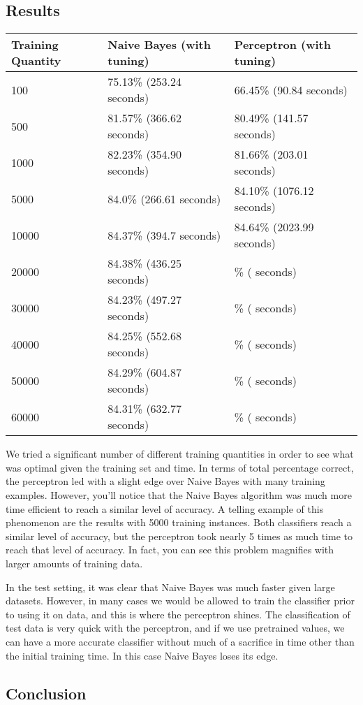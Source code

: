 \documentclass{article}
\theoremstyle{remark}
\begin{document}
     \subsection*{Results}
     \begin{table}[h!]
        \centering
        \begin{tabular}{l|l|l}
        Training Quantity & Naive Bayes (with tuning) & Perceptron (with tuning)  \\ \hline
        100               & 75.13\% (253.24 seconds)  & 66.45\% (90.84 seconds)   \\
        500               & 81.57\% (366.62 seconds)  & 80.49\% (141.57 seconds)  \\
        1000              & 82.23\% (354.90 seconds)  & 81.66\% (203.01 seconds)  \\
        5000              & 84.0\% (266.61 seconds)   & 84.10\% (1076.12 seconds) \\
        10000             & 84.37\% (394.7 seconds)   & 84.64\% (2023.99 seconds) \\
        20000             & 84.38\% (436.25 seconds)  & \% ( seconds)             \\
        30000             & 84.23\% (497.27 seconds)  & \% ( seconds)             \\
        40000             & 84.25\% (552.68 seconds)  & \% ( seconds)             \\
        50000             & 84.29\% (604.87 seconds)  & \% ( seconds)             \\
        60000             & 84.31\% (632.77 seconds)  & \% ( seconds)             \\
        \end{tabular}
     \end{table}
     We tried a significant number of different training quantities in order to see what was optimal given the training set and time. In terms of total percentage correct, the perceptron led with a slight edge over Naive Bayes with many training examples. However, you'll notice that the Naive Bayes algorithm was much more time efficient to reach a similar level of accuracy. A telling example of this phenomenon are the results with 5000 training instances. Both classifiers reach a similar level of accuracy, but the perceptron took nearly 5 times as much time to reach that level of accuracy. In fact, you can see this problem magnifies with larger amounts of training data.

     In the test setting, it was clear that Naive Bayes was much faster given large datasets. However, in many cases we would be allowed to train the classifier prior to using it on data, and this is where the perceptron shines. The classification of test data is very quick with the perceptron, and if we use pretrained values, we can have a more accurate classifier without much of a sacrifice in time other than the initial training time. In this case Naive Bayes loses its edge. 
     \subsection*{Conclusion}



    
\end{document}
